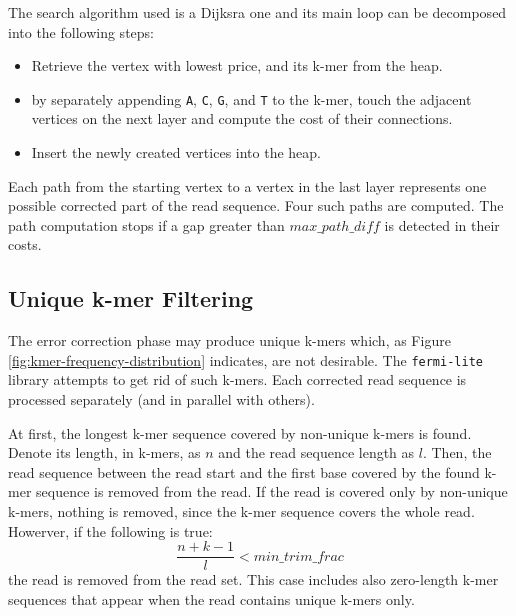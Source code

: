 The search algorithm used is a Dijksra one and its main loop can be decomposed into the following steps:
\begin{itemize}
\item Retrieve the vertex with lowest price, and its k-mer from the heap.
\item by separately appending \texttt{A}, \texttt{C}, \texttt{G}, and \texttt{T} to the k-mer, touch the adjacent vertices on the next layer and compute the cost of their connections.
\item Insert the newly created vertices into the heap.
\end{itemize}

Each path from the starting vertex to a vertex in the last layer represents one possible corrected part of the read sequence. Four such paths are computed. The path computation stops if a gap greater than $max\_path\_diff$ is detected in their costs.

\subsection{Unique k-mer Filtering}
\label{subsec:fermi-unique-kmer-filtering}

The error correction phase may produce unique k-mers which, as Figure \ref{fig:kmer-frequency-distribution} indicates, are not desirable. The \texttt{fermi-lite} library attempts to get rid of such k-mers. Each corrected read sequence is processed separately (and in parallel with others). 

At first, the longest k-mer sequence covered by non-unique k-mers is found. Denote its length, in k-mers, as $n$ and the read sequence length as $l$. Then, the read sequence between the read start and the first base covered by the found k-mer sequence is removed from the read. If the read is covered only by non-unique k-mers, nothing is removed, since the k-mer sequence covers the whole read. Howerver, if the following is true:
$$
\frac{n + k - 1}{l} < min\_trim\_frac
$$
the read is removed from the read set. This case includes also zero-length k-mer sequences that appear when the read contains unique k-mers only.